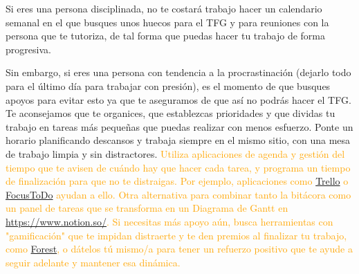 Si eres una persona disciplinada, no te costará trabajo hacer un calendario semanal en el que busques unos huecos para el TFG y para reuniones con la persona que te tutoriza, de tal forma que puedas hacer tu trabajo de forma progresiva. 

Sin embargo, si eres una persona con tendencia a la procrastinación (dejarlo todo para el último día para trabajar con presión), es el momento de que busques apoyos para evitar esto ya que te aseguramos de que así no podrás hacer el TFG. Te aconsejamos que te organices, que establezcas prioridades y que dividas tu trabajo en tareas más pequeñas que puedas realizar con menos esfuerzo. Ponte un horario planificando descansos y trabaja siempre en el mismo sitio, con una mesa de trabajo limpia y sin distractores. \textcolor{orange}{Utiliza aplicaciones de agenda y gestión del tiempo que te avisen de cuándo hay que hacer cada tarea, y programa un tiempo de finalización para que no te distraigas. Por ejemplo, aplicaciones como \href{https://trello.com/}{Trello} o \href{https://www.focustodo.cn/}{FocusToDo} ayudan a ello. Otra alternativa para combinar tanto la bitácora como un panel de tareas que se transforma en un Diagrama de Gantt en \url{https://www.notion.so/}. Si necesitas más apoyo aún, busca herramientas con "gamificación" que te impidan distraerte y te den premios al finalizar tu trabajo, como \href{https://www.forestapp.cc/}{Forest}, o dátelos tú mismo/a para tener un refuerzo positivo que te ayude a seguir adelante y mantener esa dinámica. }

